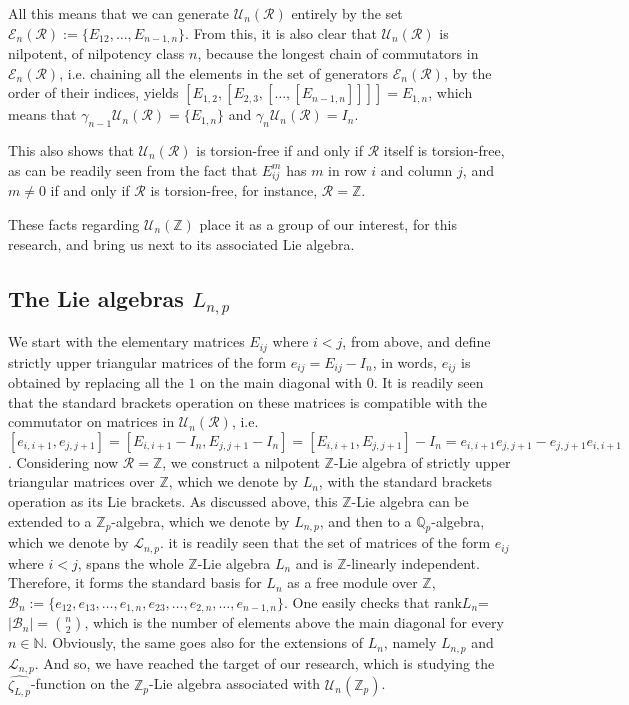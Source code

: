 \documentclass[12pt]{article}
\begin{document}
All this means that we can generate $\mathcal{U}_n(\mathcal{R})$ entirely by the set $\mathcal{E}_n(\mathcal{R}):=\{E_{12},\dots,E_{n-1,n}\}$. From this, it is also clear that $\mathcal{U}_n(\mathcal{R})$ is nilpotent, of nilpotency class $n$, because the longest chain of commutators in $\mathcal{E}_n(\mathcal{R})$, i.e. chaining all the elements in the set of generators $\mathcal{E}_n(\mathcal{R})$, by the order of their indices, yields $[E_{1,2},[E_{2,3},[\dots,[E_{n-1,n}]]]]=E_{1,n}$, which means that $\gamma_{n-1}\mathcal{U}_n(\mathcal{R})=\{E_{1,n}\}$ and $\gamma_n \mathcal{U}_n(\mathcal{R})=I_n$.\par
This also shows that $\mathcal{U}_n(\mathcal{R})$ is torsion-free if and only if $\mathcal{R}$ itself is torsion-free, as can be readily seen from the fact that $E_{ij}^m$ has $m$ in row $i$ and column $j$, and $m\neq 0$ if and only if $\mathcal{R}$ is torsion-free, for instance, $\mathcal{R}=\mathbb{Z}$.\par
These facts regarding $\mathcal{U}_n(\mathbb{Z})$ place it as a group of our interest, for this research, and bring us next to its associated Lie algebra.
\subsection{The Lie algebras $L_{n,p}$}
We start with the elementary matrices $E_{ij}$ where $i<j$, from above, and define strictly upper triangular matrices of the form $e_{ij}=E_{ij}-I_n$, in words, $e_{ij}$ is obtained by replacing all the $1$ on the main diagonal with $0$. It is readily seen that the standard brackets operation on these matrices is compatible with the commutator on matrices in $\mathcal{U}_n(\mathcal{R})$, i.e. $[e_{i,i+1},e_{j,j+1}]=[E_{i,i+1}-I_n,E_{j,j+1}-I_n]=[E_{i,i+1},E_{j,j+1}]-I_n=e_{i,i+1}e_{j,j+1}-e_{j,j+1}e_{i,i+1}$. Considering now $\mathcal{R}=\mathbb{Z}$, we construct a nilpotent $\mathbb{Z}$-Lie algebra of strictly upper triangular matrices over $\mathbb{Z}$, which we denote by $L_n$, with the standard brackets operation as its Lie brackets. As discussed above, this $\mathbb{Z}$-Lie algebra can be extended to a $\mathbb{Z}_p$-algebra, which we denote by $L_{n,p}$, and then to a $\mathbb{Q}_p$-algebra, which we denote by $\mathcal{L}_{n,p}$.
it is readily seen that the set of matrices of the form $e_{ij}$ where $i<j$, spans the whole $\mathbb{Z}$-Lie algebra $L_n$ and is $\mathbb{Z}$-linearly independent. Therefore, it forms the standard basis for $L_n$ as a free module over $\mathbb{Z}$, $\mathcal{B}_n:=\{e_{12},e_{13},\dots,e_{1,n},e_{23},\dots,e_{2,n},\dots,e_{n-1,n}\}$. One easily checks that rank$L_n$=$|\mathcal{B}_n|=\binom{n}{2}$, which is the number of elements above the main diagonal for every $n\in\mathbb{N}$. Obviously, the same goes also for the extensions of $L_n$, namely $L_{n,p}$ and $\mathcal{L}_{n,p}$. And so, we have reached the target of our research, which is studying the $\hat{\zeta_{L,p}}$-function on the $\mathbb{Z}_p$-Lie algebra associated with $\mathcal{U}_n(\mathbb{Z}_p)$.
\end{document}
